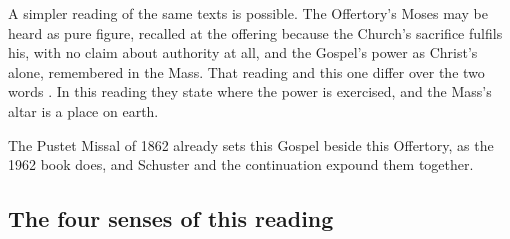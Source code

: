 A simpler reading of the same texts is possible. The Offertory's Moses may be
heard as pure figure, recalled at the offering because the Church's sacrifice
fulfils his, with no claim about authority at all, and the Gospel's power as
Christ's alone, remembered in the Mass. That reading and this one differ over
the two words . In this reading they state where the power is
exercised, and the Mass's altar is a place on earth.

The Pustet Missal of 1862 already sets this Gospel beside this Offertory, as
the 1962 book does, and Schuster and the continuation expound them together.

\subsection{The four senses of this reading}

